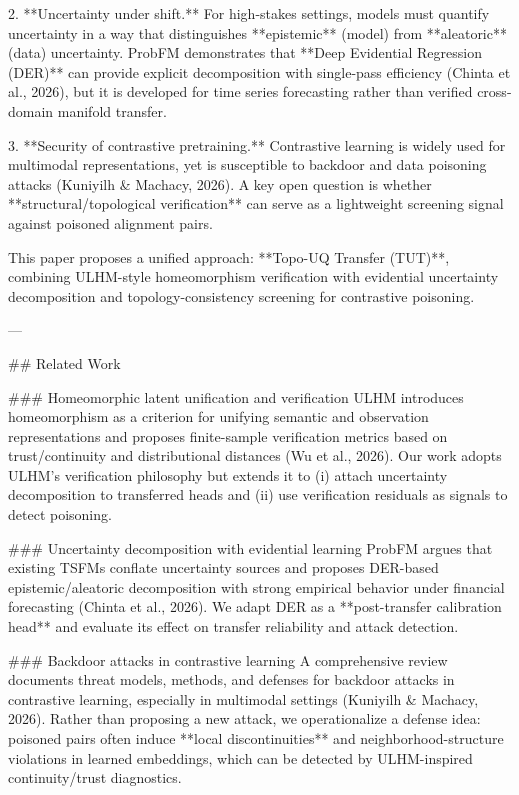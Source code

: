 2. **Uncertainty under shift.** For high-stakes settings, models must quantify uncertainty in a way that distinguishes **epistemic** (model) from **aleatoric** (data) uncertainty. ProbFM demonstrates that **Deep Evidential Regression (DER)** can provide explicit decomposition with single-pass efficiency (Chinta et al., 2026), but it is developed for time series forecasting rather than verified cross-domain manifold transfer.

3. **Security of contrastive pretraining.** Contrastive learning is widely used for multimodal representations, yet is susceptible to backdoor and data poisoning attacks (Kuniyilh & Machacy, 2026). A key open question is whether **structural/topological verification** can serve as a lightweight screening signal against poisoned alignment pairs.

This paper proposes a unified approach: **Topo-UQ Transfer (TUT)**, combining ULHM-style homeomorphism verification with evidential uncertainty decomposition and topology-consistency screening for contrastive poisoning.

---

## Related Work  

### Homeomorphic latent unification and verification  
ULHM introduces homeomorphism as a criterion for unifying semantic and observation representations and proposes finite-sample verification metrics based on trust/continuity and distributional distances (Wu et al., 2026). Our work adopts ULHM’s verification philosophy but extends it to (i) attach uncertainty decomposition to transferred heads and (ii) use verification residuals as signals to detect poisoning.

### Uncertainty decomposition with evidential learning  
ProbFM argues that existing TSFMs conflate uncertainty sources and proposes DER-based epistemic/aleatoric decomposition with strong empirical behavior under financial forecasting (Chinta et al., 2026). We adapt DER as a **post-transfer calibration head** and evaluate its effect on transfer reliability and attack detection.

### Backdoor attacks in contrastive learning  
A comprehensive review documents threat models, methods, and defenses for backdoor attacks in contrastive learning, especially in multimodal settings (Kuniyilh & Machacy, 2026). Rather than proposing a new attack, we operationalize a defense idea: poisoned pairs often induce **local discontinuities** and neighborhood-structure violations in learned embeddings, which can be detected by ULHM-inspired continuity/trust diagnostics.

